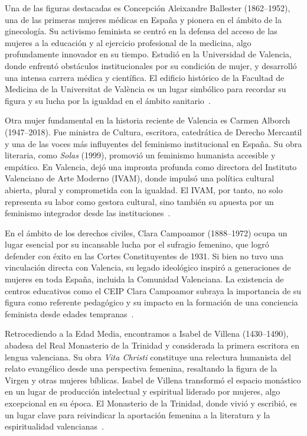 Una de las figuras destacadas es Concepción Aleixandre Ballester (1862–1952), una de las primeras mujeres médicas en España y pionera en el ámbito de la ginecología. Su activismo feminista se centró en la defensa del acceso de las mujeres a la educación y al ejercicio profesional de la medicina, algo profundamente innovador en su tiempo. Estudió en la Universidad de Valencia, donde enfrentó obstáculos institucionales por su condición de mujer, y desarrolló una intensa carrera médica y científica. El edificio histórico de la Facultad de Medicina de la Universitat de València es un lugar simbólico para recordar su figura y su lucha por la igualdad en el ámbito sanitario~\cite{guijarro2021}.

Otra mujer fundamental en la historia reciente de Valencia es Carmen Alborch (1947–2018). Fue ministra de Cultura, escritora, catedrática de Derecho Mercantil y una de las voces más influyentes del feminismo institucional en España. Su obra literaria, como \textit{Solas} (1999), promovió un feminismo humanista accesible y empático. En Valencia, dejó una impronta profunda como directora del Instituto Valenciano de Arte Moderno (IVAM), donde impulsó una política cultural abierta, plural y comprometida con la igualdad. El IVAM, por tanto, no solo representa su labor como gestora cultural, sino también su apuesta por un feminismo integrador desde las instituciones~\cite{alborch1999}.

En el ámbito de los derechos civiles, Clara Campoamor (1888–1972) ocupa un lugar esencial por su incansable lucha por el sufragio femenino, que logró defender con éxito en las Cortes Constituyentes de 1931. Si bien no tuvo una vinculación directa con Valencia, su legado ideológico inspiró a generaciones de mujeres en toda España, incluida la Comunidad Valenciana. La existencia de centros educativos como el CEIP Clara Campoamor subraya la importancia de su figura como referente pedagógico y su impacto en la formación de una conciencia feminista desde edades tempranas~\cite{gonzalez2006}.

Retrocediendo a la Edad Media, encontramos a Isabel de Villena (1430–1490), abadesa del Real Monasterio de la Trinidad y considerada la primera escritora en lengua valenciana. Su obra \textit{Vita Christi} constituye una relectura humanista del relato evangélico desde una perspectiva femenina, resaltando la figura de la Virgen y otras mujeres bíblicas. Isabel de Villena transformó el espacio monástico en un lugar de producción intelectual y espiritual liderado por mujeres, algo excepcional en su época. El Monasterio de la Trinidad, donde vivió y escribió, es un lugar clave para reivindicar la aportación femenina a la literatura y la espiritualidad valencianas~\cite{rueda2013}.

